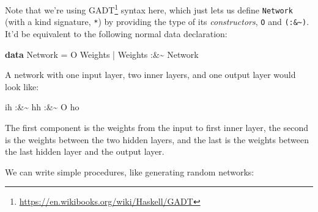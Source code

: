 \documentclass[]{article}
\newenvironment{Shaded}{}{}
\newcommand{\DataTypeTok}[1]{\textcolor[rgb]{0.56,0.13,0.00}{#1}}
\newcommand{\KeywordTok}[1]{\textcolor[rgb]{0.00,0.44,0.13}{\textbf{#1}}}
\newcommand{\NormalTok}[1]{#1}
\newcommand{\OperatorTok}[1]{\textcolor[rgb]{0.40,0.40,0.40}{#1}}
\newcommand{\OtherTok}[1]{\textcolor[rgb]{0.00,0.44,0.13}{#1}}
\renewcommand{\href}[2]{#2\footnote{\url{#1}}}
\begin{document}
Note that we're using \href{https://en.wikibooks.org/wiki/Haskell/GADT}{GADT}
syntax here, which just lets us define \texttt{Network} (with a kind signature,
\texttt{*}) by providing the type of its \emph{constructors}, \texttt{O} and
\texttt{(:\&\textasciitilde{})}. It'd be equivalent to the following normal data
declaration:

\begin{Shaded}
\begin{Highlighting}[]
\KeywordTok{data} \DataTypeTok{Network} \OtherTok{=} \DataTypeTok{O} \DataTypeTok{Weights}
             \OperatorTok{|} \DataTypeTok{Weights} \OperatorTok{:\&\textasciitilde{}} \DataTypeTok{Network}
\end{Highlighting}
\end{Shaded}

A network with one input layer, two inner layers, and one output layer would
look like:

\begin{Shaded}
\begin{Highlighting}[]
\NormalTok{ih }\OperatorTok{:\&\textasciitilde{}}\NormalTok{ hh }\OperatorTok{:\&\textasciitilde{}} \DataTypeTok{O}\NormalTok{ ho}
\end{Highlighting}
\end{Shaded}

The first component is the weights from the input to first inner layer, the
second is the weights between the two hidden layers, and the last is the weights
between the last hidden layer and the output layer.

We can write simple procedures, like generating random networks:
\end{document}
